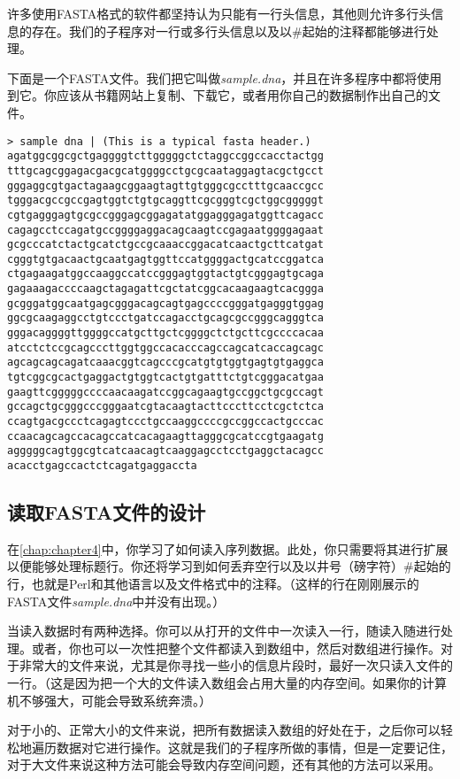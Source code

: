 许多使用FASTA格式的软件都坚持认为只能有一行头信息，其他则允许多行头信息的存在。我们的子程序对一行或多行头信息以及以\#起始的注释都能够进行处理。

下面是一个FASTA文件。我们把它叫做\textit{sample.dna}，并且在许多程序中都将使用到它。你应该从书籍网站上复制、下载它，或者用你自己的数据制作出自己的文件。

\begin{lstlisting}
> sample dna | (This is a typical fasta header.)
agatggcggcgctgaggggtcttgggggctctaggccggccacctactgg
tttgcagcggagacgacgcatggggcctgcgcaataggagtacgctgcct
gggaggcgtgactagaagcggaagtagttgtgggcgcctttgcaaccgcc
tgggacgccgccgagtggtctgtgcaggttcgcgggtcgctggcgggggt
cgtgagggagtgcgccgggagcggagatatggagggagatggttcagacc
cagagcctccagatgccggggaggacagcaagtccgagaatggggagaat
gcgcccatctactgcatctgccgcaaaccggacatcaactgcttcatgat
cgggtgtgacaactgcaatgagtggttccatggggactgcatccggatca
ctgagaagatggccaaggccatccgggagtggtactgtcgggagtgcaga
gagaaagaccccaagctagagattcgctatcggcacaagaagtcacggga
gcgggatggcaatgagcgggacagcagtgagccccgggatgagggtggag
ggcgcaagaggcctgtccctgatccagacctgcagcgccgggcagggtca
gggacaggggttggggccatgcttgctcggggctctgcttcgccccacaa
atcctctccgcagcccttggtggccacacccagccagcatcaccagcagc
agcagcagcagatcaaacggtcagcccgcatgtgtggtgagtgtgaggca
tgtcggcgcactgaggactgtggtcactgtgatttctgtcgggacatgaa
gaagttcgggggccccaacaagatccggcagaagtgccggctgcgccagt
gccagctgcgggcccgggaatcgtacaagtacttcccttcctcgctctca
ccagtgacgccctcagagtccctgccaaggccccgccggccactgcccac
ccaacagcagccacagccatcacagaagttagggcgcatccgtgaagatg
agggggcagtggcgtcatcaacagtcaaggagcctcctgaggctacagcc
acacctgagccactctcagatgaggaccta
\end{lstlisting}

\subsection{读取FASTA文件的设计}
在\autoref{chap:chapter4}中，你学习了如何读入序列数据。此处，你只需要将其进行扩展以便能够处理标题行。你还将学习到如何丢弃空行以及以井号（磅字符）\#起始的行，也就是Perl和其他语言以及文件格式中的注释。（这样的行在刚刚展示的FASTA文件\textit{sample.dna}中并没有出现。）

当读入数据时有两种选择。你可以从打开的文件中一次读入一行，随读入随进行处理。或者，你也可以一次性把整个文件都读入到数组中，然后对数组进行操作。对于非常大的文件来说，尤其是你寻找一些小的信息片段时，最好一次只读入文件的一行。（这是因为把一个大的文件读入数组会占用大量的内存空间。如果你的计算机不够强大，可能会导致系统奔溃。）

对于小的、正常大小的文件来说，把所有数据读入数组的好处在于，之后你可以轻松地遍历数据对它进行操作。这就是我们的子程序所做的事情，但是一定要记住，对于大文件来说这种方法可能会导致内存空间问题，还有其他的方法可以采用。

